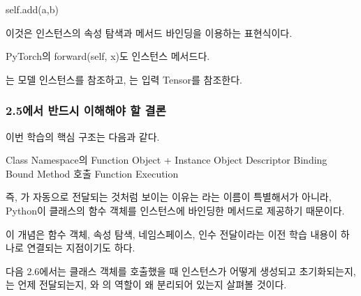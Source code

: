 \begin{dhkcode}
self.add(a,b)
\end{dhkcode}

이것은 인스턴스의 속성 탐색과 메서드 바인딩을 이용하는 표현식이다.

\begin{dhknote}
\begin{dhksmry}[centered]
PyTorch의 forward(self, x)도 인스턴스 메서드다.
\end{dhksmry}
\end{dhknote}

는 모델 인스턴스를 참조하고, 는 입력 Tensor를 참조한다.

\subsubsection{2.5에서 반드시 이해해야 할 결론}

이번 학습의 핵심 구조는 다음과 같다.

\begin{dhksmry}[centered]
Class Namespace의 Function Object
+
Instance Object
\da
Descriptor Binding
\da
Bound Method
\da
호출
\da
Function Execution
\end{dhksmry}

즉, 가 자동으로 전달되는 것처럼 보이는 이유는 라는 이름이 특별해서가 아니라, Python이 클래스의 함수 객체를 인스턴스에 바인딩한 메서드로 제공하기 때문이다.

이 개념은 함수 객체, 속성 탐색, 네임스페이스, 인수 전달이라는 이전 학습 내용이 하나로 연결되는 지점이기도 하다.

다음 2.6에서는 클래스 객체를 호출했을 때 인스턴스가 어떻게 생성되고 초기화되는지, 는 언제 전달되는지, 와 의 역할이 왜 분리되어 있는지 살펴볼 것이다.
